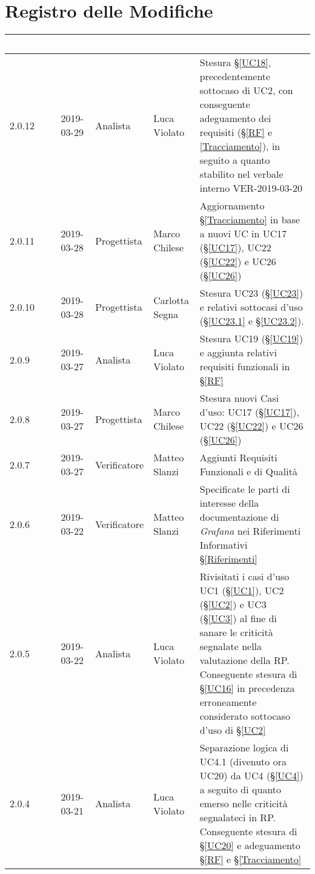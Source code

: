 \section*{Registro delle Modifiche}

\begin{center}
\begin{longtable}[C]{|m{}|m{}|m{}|m{}|p{}|}
\hline
\rowcolor{bluelogo}\textbf{\textcolor{white}{Versione}} & \textbf{\textcolor{white}{Data}} & \textbf{\textcolor{white}{Ruolo}} & \textbf{\textcolor{white}{Autore}} & \textbf{\textcolor{white}{Descrizione}} \\
\hline \hline
\endhead
2.0.12 & 2019-03-29 & Analista & Luca Violato & Stesura §\ref{UC18}, precedentemente sottocaso di UC2, con conseguente adeguamento dei requisiti (§\ref{RF} e \ref{Tracciamento}), in seguito a quanto stabilito nel verbale interno VER-2019-03-20\\
\hline
\rowcolor{grigio}2.0.11 & 2019-03-28 & Progettista & Marco Chilese & Aggiornamento §\ref{Tracciamento} in base a nuovi UC in UC17 (§\ref{UC17}), UC22 (§\ref{UC22}) e UC26 (§\ref{UC26})\\
\hline
2.0.10 & 2019-03-28 & Progettista & Carlotta Segna & Stesura UC23 (§\ref{UC23}) e relativi sottocasi d'uso (§\ref{UC23.1} e §\ref{UC23.2}). \\
\hline
\rowcolor{grigio}2.0.9 & 2019-03-27 & Analista & Luca Violato & Stesura UC19 (§\ref{UC19}) e aggiunta relativi requisiti funzionali in §\ref{RF}\\
\hline
2.0.8 & 2019-03-27 & Progettista & Marco Chilese & Stesura nuovi Casi d'uso: UC17 (§\ref{UC17}), UC22 (§\ref{UC22}) e UC26 (§\ref{UC26})\\
\hline
\rowcolor{grigio}2.0.7 & 2019-03-27 & Verificatore & Matteo Slanzi & Aggiunti Requisiti Funzionali e di Qualità\\
\hline
2.0.6 & 2019-03-22 & Verificatore & Matteo Slanzi & Specificate le parti di interesse della documentazione di \textit{Grafana} nei Riferimenti Informativi §\ref{Riferimenti} \\
\hline 
\rowcolor{grigio}2.0.5 & 2019-03-22 & Analista & Luca Violato & Rivisitati i casi d'uso UC1 (§\ref{UC1}), UC2 (§\ref{UC2}) e UC3 (§\ref{UC3}) al fine di sanare le criticità segnalate nella valutazione della RP. Conseguente stesura di §\ref{UC16} in precedenza erroneamente considerato sottocaso d'uso di §\ref{UC2}\\
\hline
2.0.4 & 2019-03-21 & Analista & Luca Violato & Separazione logica di UC4.1 (divenuto ora UC20) da UC4 (§\ref{UC4}) a seguito di quanto emerso nelle criticità segnalateci in RP. Conseguente stesura di §\ref{UC20} e adeguamento §\ref{RF} e §\ref{Tracciamento}\\

\end{longtable}
\end{center}
